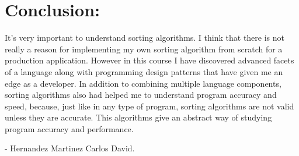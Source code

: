 \section{Conclusion:}

It's very important to understand sorting algorithms. I think that there is not really a reason for implementing my own sorting algorithm from scratch for a production application. However in this course I have discovered advanced facets of a language along with programming design patterns that have given me an edge as a developer. In addition to combining multiple language components, sorting algorithms also had helped me to understand program accuracy and speed, because, just like in any type of program, sorting algorithms are not valid unless they are accurate. This algorithms give an abstract way of studying program accuracy and performance.

\begin{flushright}
- Hernandez Martinez Carlos David.
\end{flushright} \hfill \break


\pagebreak